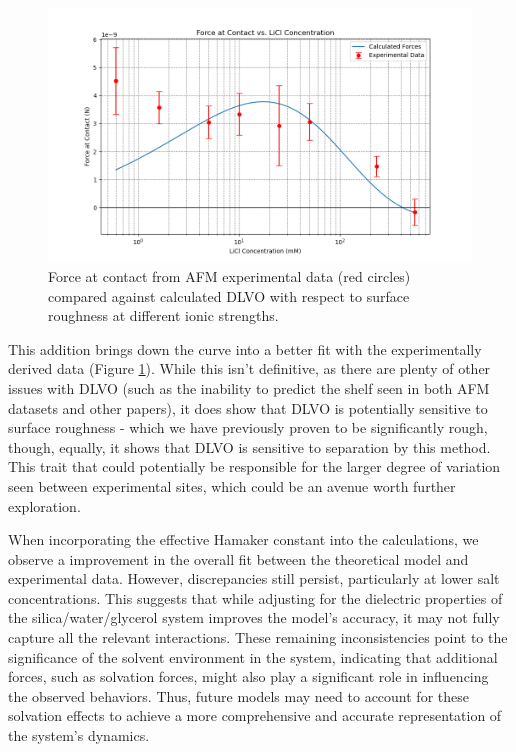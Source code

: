 \begin{figure}[h!]
\centering
\includegraphics[width=\textwidth]{chapter8/Calculated/roughness.png}
\caption{Force at contact from AFM experimental data (red circles) compared against calculated DLVO with respect to surface roughness at different ionic strengths.}
\label{fig:calc2}
\end{figure}

This addition brings down the curve into a better fit with the experimentally derived data (Figure \ref{fig:calc2}). While this isn't definitive, as there are plenty of other issues with DLVO (such as the inability to predict the shelf seen in both AFM datasets and other papers), it does show that DLVO is potentially sensitive to surface roughness - which we have previously proven to be significantly rough, though, equally, it shows that DLVO is sensitive to separation by this method. This trait that could potentially be responsible for the larger degree of variation seen between experimental sites, which could be an avenue worth further exploration.


When incorporating the effective Hamaker constant into the calculations, we observe a  improvement in the overall fit between the theoretical model and experimental data. However, discrepancies still persist, particularly at lower salt concentrations. This suggests that while adjusting for the dielectric properties of the silica/water/glycerol system improves the model's accuracy, it may not fully capture all the relevant interactions. These remaining inconsistencies point to the significance of the solvent environment in the system, indicating that additional forces, such as solvation forces, might also play a significant role in influencing the observed behaviors. Thus, future models may need to account for these solvation effects to achieve a more comprehensive and accurate representation of the system's dynamics.

